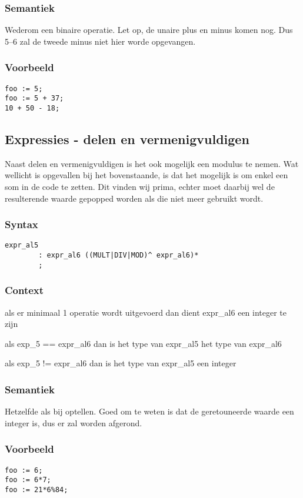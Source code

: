 \documentclass[]{article}
\begin{document}
\subsubsection{Semantiek}
Wederom een binaire operatie. Let op, de unaire plus en minus komen nog. Dus 5--6 zal de tweede minus niet hier worde opgevangen.
\subsubsection{Voorbeeld}
\begin{lstlisting}[style=SELMA]
foo := 5;
foo := 5 + 37;
10 + 50 - 18;
\end{lstlisting}

\subsection{Expressies - delen en vermenigvuldigen}
Naast delen en vermenigvuldigen is het ook mogelijk een modulus te nemen.
Wat wellicht is opgevallen bij het bovenstaande, is dat het mogelijk is om enkel een som in de code te zetten. Dit vinden wij prima, echter moet daarbij wel de resulterende waarde gepopped worden als die niet meer gebruikt wordt.
\subsubsection{Syntax}
\begin{lstlisting}[style=ANTLR]
	expr_al5
		: expr_al6 ((MULT|DIV|MOD)^ expr_al6)*
		;
\end{lstlisting}
\subsubsection{Context}
\begin{list}{•}{•}
\item als er minimaal 1 operatie wordt uitgevoerd dan dient expr\_al6 een integer te zijn
\item als exp\_5 == expr\_al6 dan is het type van expr\_al5 het type van expr\_al6
\item als exp\_5 != expr\_al6 dan is het type van expr\_al5 een integer
\end{list}
\subsubsection{Semantiek}
Hetzelfde als bij optellen. Goed om te weten is dat de geretouneerde waarde een integer is, dus er zal worden afgerond.
\subsubsection{Voorbeeld}
\begin{lstlisting}[style=SELMA]
foo := 6;
foo := 6*7;
foo := 21*6%84;
\end{lstlisting}
\end{document}
